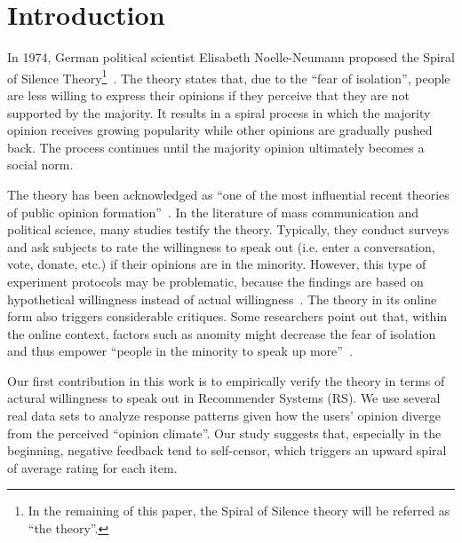 \documentclass{sig-alternate}
\begin{document}




\section{Introduction}\label{sec:introduction}

In 1974, German political scientist Elisabeth Noelle-Neumann proposed the Spiral of Silence Theory\footnote{In the remaining of this paper, the Spiral of Silence theory will be referred as ``the theory''.}~\cite{Neolle-Neumann1993spiral}. The theory states that, due to the ``fear of isolation'', people are less willing to express their opinions if they perceive that they are not supported by the majority. It results in a spiral process in which the majority opinion receives growing popularity while other opinions are gradually pushed back. The process continues until the majority opinion ultimately becomes a social norm.

The theory has been acknowledged as ``one of the most influential recent theories of public opinion formation''~\cite{Kennamer1990Self}. In the literature of mass communication and political science, many studies testify the theory. Typically, they conduct surveys and ask subjects to rate the willingness to speak out (i.e. enter a conversation, vote, donate, etc.) if their opinions are in the minority. However, this type of experiment protocols may be problematic, because the findings are based on hypothetical willingness instead of actual willingness~\cite{Carroll1997Perceived}. The theory in its online form also triggers considerable critiques. Some researchers point out that, within the online context, factors such as anomity might decrease the fear of isolation and thus empower ``people in the minority to speak up more''~\cite{mcdevitt2003spiral}.

Our first contribution in this work is to empirically verify the theory in terms of actural willingness to speak out in Recommender Systems (RS). We use several real data sets to analyze response patterns given how the users' opinion diverge from the perceived ``opinion climate''. Our study suggests that, especially in the beginning, negative feedback tend to self-censor,  which triggers an upward spiral of average rating for each item.
\end{document}
